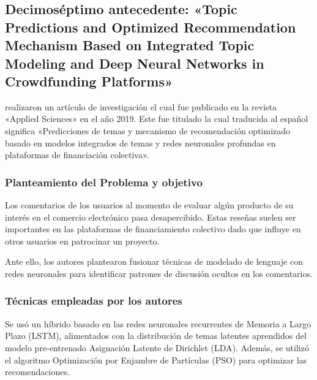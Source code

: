 \subsection{Decimoséptimo antecedente: «Topic Predictions and Optimized Recommendation	Mechanism Based on Integrated Topic Modeling and Deep Neural Networks in Crowdfunding Platforms» \citep*{pr_shafqat2019topicpredictions}}
\citeauthor{pr_shafqat2019topicpredictions} realizaron un artículo de investigación el cual fue publicado en la revista «Applied Sciences» en el año 2019. Este fue titulado  la cual traducida al español significa «Predicciones de temas y mecanismo de recomendación optimizado basado en modelos integrados de temas y redes neuronales profundas en plataformas de financiación colectiva».

\subsubsection{Planteamiento del Problema y objetivo}
Los comentarios de los usuarios al momento de evaluar algún producto de su interés en el comercio electrónico pasa desapercibido. Estas reseñas suelen ser importantes en las plataformas de financiamiento colectivo dado que influye en otros usuarios en patrocinar un proyecto.

Ante ello, los autores plantearon fusionar técnicas de modelado de lenguaje con redes neuronales para identificar patrones de discusión ocultos en los comentarios.

\subsubsection{Técnicas empleadas por los autores}
Se usó un híbrido basado en las redes neuronales recurrentes de Memoria a Largo Plazo (LSTM), alimentados con la distribución de temas latentes aprendidos del modelo pre-entrenado Asignación Latente de Dirichlet (LDA). Además, se utilizó el algoritmo Optimización por Enjambre de Partículas (PSO) para optimizar las recomendaciones.

